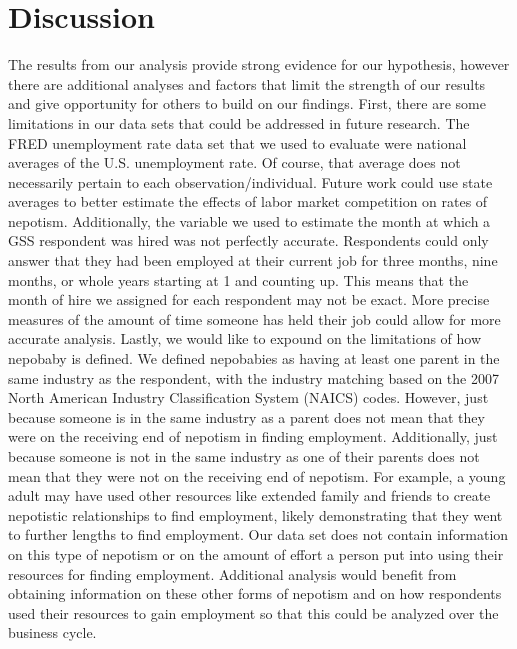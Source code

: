 \documentclass[12pt]{article}
\begin{document}
 



\section{Discussion}
\label{sec:discussion}
The results from our analysis provide strong evidence for our hypothesis, however there are additional analyses and factors that limit the strength of our results and give opportunity for others to build on our findings. First, there are some limitations in our data 
sets that could be addressed in future research. The FRED unemployment rate data set that we used to evaluate were national averages of the U.S. unemployment rate. Of course, that average does not necessarily pertain to each observation/individual. Future work could use state averages to better estimate the effects of labor market competition on rates of nepotism. Additionally, the variable we used to estimate the month at which a GSS respondent was hired was not perfectly accurate. Respondents could only answer that they had been employed at their current job for three months, nine months, or whole years starting at 1 and counting up. This means that the month of hire we assigned for each respondent may not be exact. More precise measures of the amount of time someone has held their job could allow for more accurate analysis. Lastly, we would like to expound on the limitations of how nepobaby is defined. We defined nepobabies as having at least one parent in the same industry as the respondent, with the industry matching based on the 2007 North American Industry Classification System (NAICS) codes. However, just because someone is in the same industry as a parent does not mean that they were on the receiving end of nepotism in finding employment. Additionally, just because someone is not in the same industry as one of their parents does not mean that they were not on the receiving end of nepotism. For example, a young adult may have used other resources like extended family and friends to create nepotistic relationships to find employment, likely demonstrating that they went to further lengths to find employment. Our data set does not contain information on this type of nepotism or on the amount of effort a person put into using their resources for finding employment. Additional analysis would benefit from obtaining information on these other forms of nepotism and on how respondents used their resources to gain employment so that this could be analyzed over the business cycle.
\end{document}
